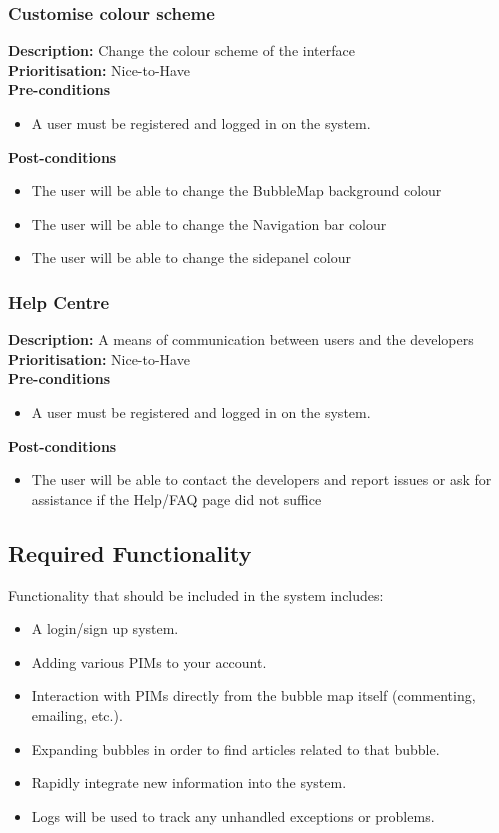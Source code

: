 \documentclass[hidelinks,english]{article}
\begin{document}
    	    \subsubsection{Customise colour scheme}
				\textbf{Description:} Change the colour scheme of the interface\\
			    \textbf{Prioritisation:} Nice-to-Have\\
      			\textbf{Pre-conditions}
			    \begin{itemize}
			        \item A user must be registered and logged in on the system.
			    \end{itemize}
    			\textbf{Post-conditions}
			    \begin{itemize}
			    	\item The user will be able to change the BubbleMap background colour
			    	\item The user will be able to change the Navigation bar colour
			    	\item The user will be able to change the sidepanel colour
    			\end{itemize}
    			
    		\subsubsection{Help Centre}
				\textbf{Description:} A means of communication between users and the developers\\
			    \textbf{Prioritisation:} Nice-to-Have\\
      			\textbf{Pre-conditions}
			    \begin{itemize}
			        \item A user must be registered and logged in on the system.
			    \end{itemize}
    			\textbf{Post-conditions}
			    \begin{itemize}
			    	\item The user will be able to contact the developers and report issues or ask for assistance if the Help/FAQ page did not suffice 
    			\end{itemize}
    			
		\subsection{Required Functionality}
			Functionality that should be included in the system includes:
			\begin{itemize}
				\item A login/sign up system. 
				\item Adding various PIMs to your account.
				\item Interaction with PIMs directly from the bubble map itself (commenting, emailing, etc.).
				\item Expanding bubbles in order to find articles related to that bubble.
				\item Rapidly integrate new information into the system.
				\item Logs will be used to track any unhandled exceptions or problems.
			\end{itemize}
		\newpage
\end{document}
